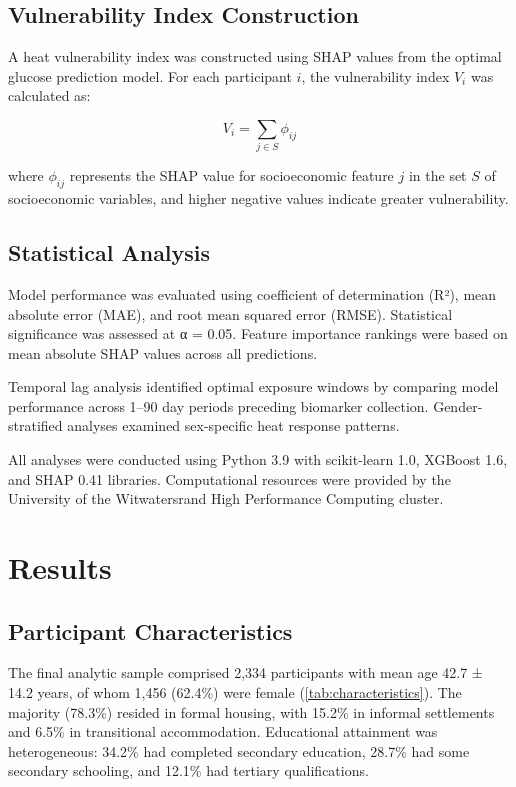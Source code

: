 \documentclass[journal,article,submit,pdftex,moreauthors]{Definitions/mdpi}
\begin{document}
\subsection{Vulnerability Index Construction}

A heat vulnerability index was constructed using SHAP values from the optimal glucose prediction model. For each participant $i$, the vulnerability index $V_i$ was calculated as:

\begin{equation}
V_i = \sum_{j \in S} \phi_{ij}
\end{equation}

where $\phi_{ij}$ represents the SHAP value for socioeconomic feature $j$ in the set $S$ of socioeconomic variables, and higher negative values indicate greater vulnerability.

\subsection{Statistical Analysis}

Model performance was evaluated using coefficient of determination (R²), mean absolute error (MAE), and root mean squared error (RMSE). Statistical significance was assessed at α = 0.05. Feature importance rankings were based on mean absolute SHAP values across all predictions.

Temporal lag analysis identified optimal exposure windows by comparing model performance across 1--90 day periods preceding biomarker collection. Gender-stratified analyses examined sex-specific heat response patterns.

All analyses were conducted using Python 3.9 with scikit-learn 1.0, XGBoost 1.6, and SHAP 0.41 libraries. Computational resources were provided by the University of the Witwatersrand High Performance Computing cluster.

\section{Results}

\subsection{Participant Characteristics}

The final analytic sample comprised 2,334 participants with mean age 42.7 ± 14.2 years, of whom 1,456 (62.4\%) were female (\cref{tab:characteristics}). The majority (78.3\%) resided in formal housing, with 15.2\% in informal settlements and 6.5\% in transitional accommodation. Educational attainment was heterogeneous: 34.2\% had completed secondary education, 28.7\% had some secondary schooling, and 12.1\% had tertiary qualifications.
\end{document}
